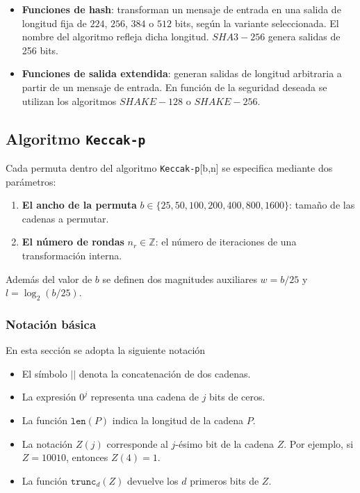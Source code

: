 \begin{itemize}
	\item \textbf{Funciones de hash}: transforman un mensaje de entrada en una salida de longitud fija de $224$, $256$, $384$ o $512$ bits, según la variante seleccionada. El nombre del algoritmo refleja dicha longitud. $SHA3-256$ genera salidas de 256 bits.
	\item \textbf{Funciones de salida extendida}: generan salidas de longitud arbitraria a partir de un mensaje de entrada. En función de la seguridad deseada se utilizan los algoritmos $SHAKE-128$ o $SHAKE-256$.
\end{itemize}
\subsection{Algoritmo \texttt{Keccak-p}}
Cada permuta dentro del algoritmo \texttt{Keccak-p}[b,n] se especifica mediante dos parámetros: 
\begin{enumerate}
	\item \textbf{El ancho de la permuta} \(b \in\{25, 50, 100, 200, 400, 800, 1600\}\): tamaño de las cadenas a permutar.
	\item \textbf{El número de rondas} \(n_r\in \mathbb{Z}\): el número de iteraciones de una transformación interna. 
\end{enumerate}
\newpage
Además del valor de \(b\) se definen dos magnitudes auxiliares \(w=b/25\) y \(l=\log_2(b/25)\).
\subsubsection{Notación básica}
En esta sección se adopta la siguiente notación

\begin{itemize}
	\item El símbolo $||$ denota la concatenación de dos cadenas.
	\item La expresión \(0^j\) representa una cadena de \(j\) bits de ceros.
	\item La función \(\texttt{len}(P)\) indica la longitud de la cadena \(P\).
	\item La notación \(Z(j)\) corresponde al \(j\)-ésimo bit de la cadena \(Z\). 
	Por ejemplo, si \(Z = 10010\), entonces \(Z(4) = 1\).
	\item La función \(\texttt{trunc}_d(Z)\) devuelve los \(d\) primeros bits de \(Z\).
\end{itemize}

